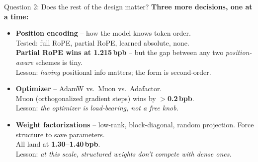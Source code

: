 \documentclass[aspectratio=169,10pt]{beamer}
\newcommand{\good}[1]{\textcolor{ok}{\textbf{#1}}}
\newcommand{\bad}[1]{\textcolor{accent}{\textbf{#1}}}
\newcommand{\bpb}{\,bpb}
\begin{document}
\begin{frame}{Question 2: Does the rest of the design matter?}
\textbf{Three more decisions, one at a time:}

\vspace{0.6em}
\begin{itemize}\setlength{\itemsep}{6pt}
  \item \textbf{Position encoding} -- how the model knows token order.\\
        {\small Tested: full RoPE, partial RoPE, learned absolute, none.}\\
        \good{Partial RoPE wins at 1.215\bpb} -- but the gap between any two
        \emph{position-aware} schemes is tiny.\\
        Lesson: \emph{having} positional info matters; the form is second-order.

  \item \textbf{Optimizer} -- AdamW vs.\ Muon vs.\ Adafactor.\\
        Muon (orthogonalized gradient steps) wins by \good{$>$0.2\bpb}. \\
        Lesson: \emph{the optimizer is load-bearing, not a free knob.}

  \item \textbf{Weight factorizations} -- low-rank, block-diagonal, random
        projection. Force structure to save parameters.\\
        All land at \bad{1.30--1.40\bpb}. \\
        Lesson: \emph{at this scale, structured weights don't compete with
        dense ones.}
\end{itemize}
\end{frame}
\end{document}
